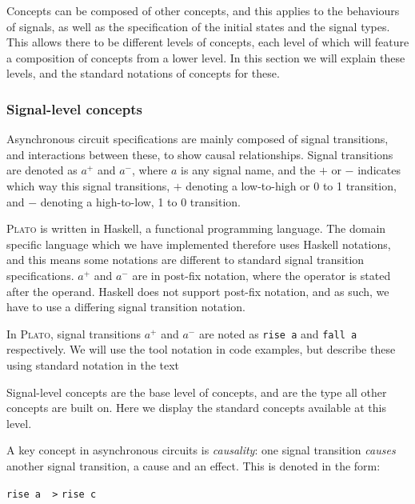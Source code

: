 \documentclass[british,conference,compsoc]{IEEEtran}
\newcommand{\noun}[1]{\textsc{#1}}
\begin{document}
Concepts can be composed of other concepts, and this applies to the behaviours 
of signals, as well as the specification of the initial states and the signal 
types. This allows there to be different levels of concepts, each level of 
which will feature a composition of concepts from a lower level. In this section we will explain these levels, and the standard notations of 
concepts for these. 

\vspace{-3mm}

\subsubsection{\label{signal-level}Signal-level concepts}Asynchronous circuit 
specifications are mainly composed of signal transitions, and interactions 
between these, to show causal relationships. Signal transitions are denoted as 
$a^{+}$ and $a^{-}$, where $a$ is any signal name, and 
the $+$ or $-$ indicates which way this signal transitions, $+$ denoting a 
low-to-high or 0 to 1 transition, and $-$ denoting a high-to-low, 1 to 0 
transition. 

\noun{Plato} is written in Haskell, a functional programming language. The 
domain specific language which we have implemented therefore uses Haskell 
notations, and this means some notations are different to standard signal 
transition specifications. $a^{+}$ and $a^{-}$ are in post-fix notation, where 
the operator is stated after the operand. Haskell does not support post-fix 
notation, and as such, we have to use a differing signal transition notation. 

In \noun{Plato}, signal transitions $a^{+}$ and $a^{-}$ are noted as \texttt{rise a} and 
\texttt{fall a} respectively. We will use the tool notation in code examples, but describe these using standard notation in the text

Signal-level concepts are the base level of concepts, and are 
the type all other concepts are built on. Here we display the standard concepts
available at this level.

A key concept in asynchronous circuits is \emph{causality}:
one signal transition \emph{causes} another signal transition, a cause and an 
effect. This is denoted in the form: 

\vspace{-2mm}

\begin{center}
{\texttt{rise a ~>} \texttt{rise c}}
\end{center}
\end{document}
